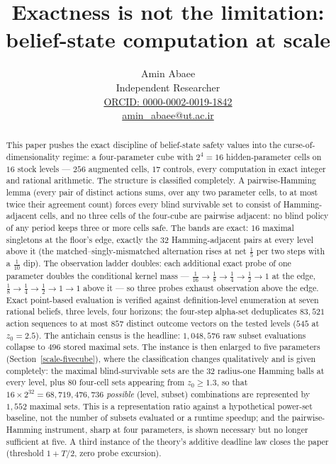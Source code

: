 \documentclass[10pt,twocolumn]{article}
\theoremstyle{plain}
\theoremstyle{definition}
\theoremstyle{remark}
\begin{document}
\title{Exactness is not the limitation: belief-state computation at scale}

\author{Amin Abaee\\[0.35em]
{\small Independent Researcher}\\[0.55em]
{\small\href{https://orcid.org/0000-0002-0019-1842}{ORCID: 0000-0002-0019-1842}}\\[0.3em]
{\small\href{mailto:amin\_abaee@ut.ac.ir}{amin\_abaee@ut.ac.ir}}}
\maketitle

\begin{abstract}
This paper pushes the exact discipline of belief-state safety values into the curse-of-dimensionality regime: a four-parameter cube with
\(2^{4} = 16\) hidden-parameter cells on \(16\) stock levels ---
\(256\) augmented cells, \(17\) controls, every computation in exact
integer and rational arithmetic. The structure is classified
completely. A pairwise-Hamming lemma (every pair of distinct actions
sums, over any two parameter cells, to at most twice their agreement
count) forces every blind survivable set to consist of
Hamming-adjacent cells, and no three cells of the four-cube are
pairwise adjacent: no blind policy of any period keeps three or more
cells safe. The bands are exact: \(16\) maximal singletons at the
floor's edge, exactly the \(32\) Hamming-adjacent pairs at every level
above it (the matched--singly-mismatched alternation rises at net
\(\tfrac15\) per two steps with a \(\tfrac1{10}\) dip). The
observation ladder doubles: each additional exact probe of one
parameter doubles the conditional kernel mass ---
\(\tfrac1{16} \to \tfrac18 \to \tfrac14 \to \tfrac12 \to 1\) at the
edge, \(\tfrac18 \to \tfrac14 \to \tfrac12 \to 1 \to 1\) above it ---
so three probes exhaust observation above the edge. Exact point-based
evaluation is verified against definition-level enumeration at seven
rational beliefs, three levels, four horizons; the four-step alpha-set
deduplicates \(83{,}521\) action sequences to at most \(857\) distinct
outcome vectors on the tested levels (\(545\) at \(z_0=2.5\)). The antichain census is the headline: \(1{,}048{,}576\) raw subset evaluations collapse to \(496\) stored maximal sets. The instance is then enlarged to five parameters (Section~\ref{scale-fivecube}), where the classification changes qualitatively and is given completely: the maximal blind-survivable sets are the \(32\) radius-one Hamming balls at every level, plus \(80\) four-cell sets appearing from \(z_{0} \ge 1.3\), so that \(16 \times 2^{32} = 68{,}719{,}476{,}736\) \emph{possible} (level, subset) combinations are represented by \(1{,}552\) maximal sets. This is a representation ratio against a hypothetical power-set baseline, not the number of subsets evaluated or a runtime speedup; and the pairwise-Hamming instrument, sharp at four parameters, is shown necessary but no longer sufficient at five. A third instance of the theory's additive deadline law closes the paper (threshold \(1 + T/2\), zero probe excursion).
\end{abstract}
\end{document}
